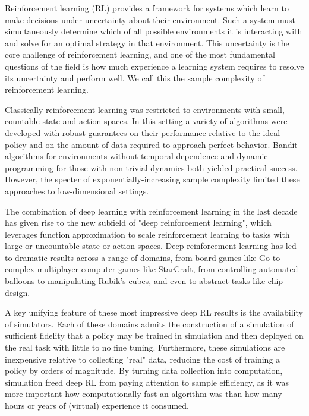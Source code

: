 
Reinforcement learning (RL) provides a framework for systems which learn to make decisions under uncertainty about their environment.
Such a system must simultaneously determine which of all possible environments it is interacting with and solve for an optimal strategy in that environment.
This uncertainty is the core challenge of reinforcement learning, and one of the most fundamental questions of the field is how much experience a learning system requires to resolve its uncertainty and perform well.
We call this the sample complexity of reinforcement learning.

Classically reinforcement learning was restricted to environments with small, countable state and action spaces.
In this setting a variety of algorithms were developed with robust guarantees on their performance relative to the ideal policy and on the amount of data required to approach perfect behavior.
Bandit algorithms for environments without temporal dependence and dynamic programming for those with non-trivial dynamics both yielded practical success.
However, the specter of exponentially-increasing sample complexity limited these approaches to low-dimensional settings.

The combination of deep learning with reinforcement learning in the last decade has given rise to the new subfield of "deep reinforcement learning", which leverages function approximation to scale reinforcement learning to tasks with large or uncountable state or action spaces.
Deep reinforcement learning has led to dramatic results across a range of domains, from board games like Go to complex multiplayer computer games like StarCraft, from controlling automated balloons to manipulating Rubik's cubes, and even to abstract tasks like chip design.

A key unifying feature of these most impressive deep RL results is the availability of simulators.
Each of these domains admits the construction of a simulation of sufficient fidelity that a policy may be trained in simulation and then deployed on the real task with little to no fine tuning.
Furthermore, these simulations are inexpensive relative to collecting "real" data, reducing the cost of training a policy by orders of magnitude.
By turning data collection into computation, simulation freed deep RL from paying attention to sample efficiency, as it was more important how computationally fast an algorithm was than how many hours or years of (virtual) experience it consumed.



